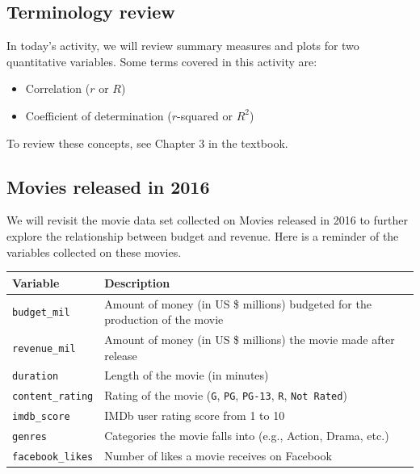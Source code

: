 \documentclass[
]{report}
\begin{document}
\hypertarget{terminology-review-7}{%
\subsection{Terminology review}\label{terminology-review-7}}

In today's activity, we will review summary measures and plots for two quantitative variables. Some terms covered in this activity are:

\begin{itemize}
\item
  Correlation (\(r\) or \(R\))
\item
  Coefficient of determination (\(r\)-squared or \(R^2\))
\end{itemize}

To review these concepts, see Chapter 3 in the textbook.

\hypertarget{movies-released-in-2016-2}{%
\subsection{Movies released in 2016}\label{movies-released-in-2016-2}}

We will revisit the movie data set collected on Movies released in 2016 to further explore the relationship between budget and revenue. Here is a reminder of the variables collected on these movies.

\begin{longtable}[]{@{}
  >{\raggedright\arraybackslash}p{}
  >{\raggedright\arraybackslash}p{}@{}}
\toprule
\textbf{Variable} & \textbf{Description} \\
\midrule
\endhead
\texttt{budget\_mil} & Amount of money (in US \$ millions) budgeted for the production of the movie \\
\texttt{revenue\_mil} & Amount of money (in US \$ millions) the movie made after release \\
\texttt{duration} & Length of the movie (in minutes) \\
\texttt{content\_rating} & Rating of the movie (\texttt{G}, \texttt{PG}, \texttt{PG-13}, \texttt{R}, \texttt{Not\ Rated}) \\
\texttt{imdb\_score} & IMDb user rating score from 1 to 10 \\
\texttt{genres} & Categories the movie falls into (e.g., Action, Drama, etc.) \\
\texttt{facebook\_likes} & Number of likes a movie receives on Facebook \\
\bottomrule
\end{longtable}
\end{document}
